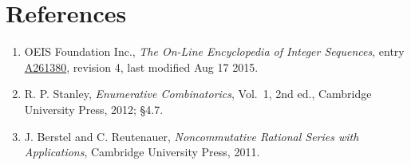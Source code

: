\documentclass[11pt]{article}
\theoremstyle{definition}
\begin{document}
\section{References}

\begin{enumerate}

\item OEIS Foundation Inc., \emph{The On-Line Encyclopedia of Integer Sequences}, entry \href{https://oeis.org/A261380}{A261380}, revision 4, last modified Aug 17 2015.

\item R. P. Stanley, \emph{Enumerative Combinatorics}, Vol.~1, 2nd ed., Cambridge University Press, 2012; \S4.7.

\item J. Berstel and C. Reutenauer, \emph{Noncommutative Rational Series with Applications}, Cambridge University Press, 2011.

\end{enumerate}
\end{document}
